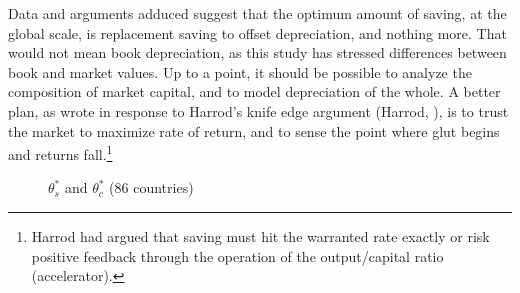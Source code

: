 Data and arguments adduced suggest that the optimum amount of
saving, at the global scale, is replacement saving to offset depreciation, and nothing
more. That would not mean book depreciation, as this study has stressed
differences between book and market values. Up to a point, it should be
possible to analyze the composition of market capital, and to model
depreciation of the whole. A better plan, as
\citet{solowContributionTheoryEconomic1956a} wrote in response to
Harrod's knife edge argument (Harrod, \citeyear{harrodEssayDynamicTheory1939}), is to
trust the market to maximize rate of return, and to sense the point
where glut begins and returns fall.\footnote{Harrod had argued that
saving must hit the warranted rate exactly or risk positive
feedback through the operation of the output/capital ratio
(accelerator).}
%
\FloatBarrier
\begin{figure}[pos=H]
    \centering
    \quad %
    \captionsetup{justification=centering}
    \caption{\(\theta^*_{s}\) and \(\theta^*_c\) (86 countries)}
    \label{fig-s_c_theta_plots}
\end{figure}
